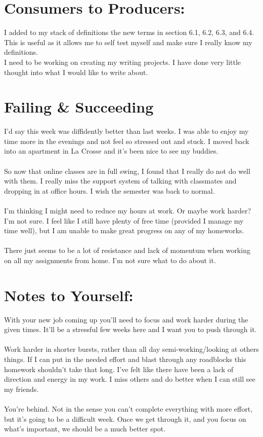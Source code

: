 \documentclass[11pt]{article}
\begin{document}
\section*{Consumers to Producers:}
I added to my stack of definitions the new terms in section 6.1, 6.2, 6.3, and 6.4. This is useful as it allows me to self test myself and make sure I really know my definitions.\\
I need to be working on creating my writing projects. I have done very little thought into what I would like to write about.

\section*{Failing \& Succeeding}
I'd say this week was diffidently better than last weeks. I was able to enjoy my time more in the evenings and not feel so stressed out and stuck. I moved back into an apartment in La Crosse and it's been nice to see my buddies.\\
\\
So now that online classes are in full swing, I found that I really do not do well with them. I really miss the support system of talking with classmates and dropping in at office hours. I wish the semester was back to normal. \\
\\
I'm thinking I might need to reduce my hours at work. Or maybe work harder? I'm not sure. I feel like I still have plenty of free time (provided I manage my time well), but I am unable to make great progress on any of my homeworks. \\
\\
There just seems to be a lot of resistance and lack of momentum when working on all my assignments from home. I'm not sure what to do about it.\\


\section*{Notes to Yourself:}
With your new job coming up you'll need to focus and work harder during the given times. It'll be a stressful few weeks here and I want you to push through it.\\
\\
Work harder in shorter bursts, rather than all day semi-working/looking at others things. If I can put in the needed effort and blast through any roadblocks this homework shouldn't take that long. I've felt like there have been a lack of direction and energy in my work. I miss others and do better when I can still see my friends. \\
\\
You're behind. Not in the sense you can't complete everything with more effort, but it's going to be a difficult week. Once we get through it, and you focus on what's important, we should be a much better spot.\\
\end{document}
